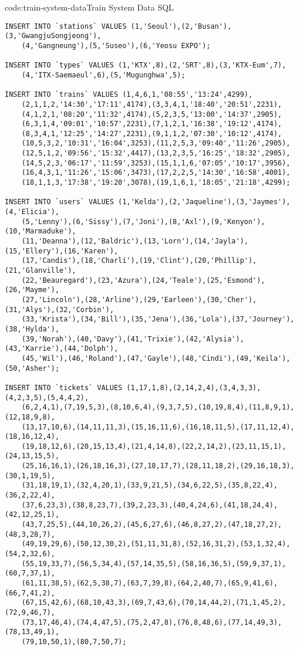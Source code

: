 \begin{codeenv}{code:train-system-data}{Train System Data SQL}\begin{verbatim}
INSERT INTO `stations` VALUES (1,'Seoul'),(2,'Busan'),(3,'GwangjuSongjeong'),
    (4,'Gangneung'),(5,'Suseo'),(6,'Yeosu EXPO');

INSERT INTO `types` VALUES (1,'KTX',8),(2,'SRT',8),(3,'KTX-Eum',7),
    (4,'ITX-Saemaeul',6),(5,'Mugunghwa',5);

INSERT INTO `trains` VALUES (1,4,6,1,'08:55','13:24',4299),
    (2,1,1,2,'14:30','17:11',4174),(3,3,4,1,'18:40','20:51',2231),
    (4,1,2,1,'08:20','11:32',4174),(5,2,3,5,'13:00','14:37',2905),
    (6,3,1,4,'09:01','10:57',2231),(7,1,2,1,'16:38','19:12',4174),
    (8,3,4,1,'12:25','14:27',2231),(9,1,1,2,'07:30','10:12',4174),
    (10,5,3,2,'10:31','16:04',3253),(11,2,5,3,'09:40','11:26',2905),
    (12,5,1,2,'09:56','15:32',4417),(13,2,3,5,'16:25','18:32',2905),
    (14,5,2,3,'06:17','11:59',3253),(15,1,1,6,'07:05','10:17',3956),
    (16,4,3,1,'11:26','15:06',3473),(17,2,2,5,'14:30','16:58',4001),
    (18,1,1,3,'17:38','19:20',3078),(19,1,6,1,'18:05','21:18',4299);

INSERT INTO `users` VALUES (1,'Kelda'),(2,'Jaqueline'),(3,'Jaymes'),(4,'Elicia'),
    (5,'Lenny'),(6,'Sissy'),(7,'Joni'),(8,'Axl'),(9,'Kenyon'),(10,'Marmaduke'),
    (11,'Deanna'),(12,'Baldric'),(13,'Lorn'),(14,'Jayla'),(15,'Ellery'),(16,'Karen'),
    (17,'Candis'),(18,'Charli'),(19,'Clint'),(20,'Phillip'),(21,'Glanville'),
    (22,'Beauregard'),(23,'Azura'),(24,'Teale'),(25,'Esmond'),(26,'Mayme'),
    (27,'Lincoln'),(28,'Arline'),(29,'Earleen'),(30,'Cher'),(31,'Alys'),(32,'Corbin'),
    (33,'Krista'),(34,'Bill'),(35,'Jena'),(36,'Lola'),(37,'Journey'),(38,'Hylda'),
    (39,'Norah'),(40,'Davy'),(41,'Trixie'),(42,'Alysia'),(43,'Karrie'),(44,'Dolph'),
    (45,'Wil'),(46,'Roland'),(47,'Gayle'),(48,'Cindi'),(49,'Keila'),(50,'Asher');

INSERT INTO `tickets` VALUES (1,17,1,8),(2,14,2,4),(3,4,3,3),(4,2,3,5),(5,4,4,2),
    (6,2,4,1),(7,19,5,3),(8,10,6,4),(9,3,7,5),(10,19,8,4),(11,8,9,1),(12,18,9,8),
    (13,17,10,6),(14,11,11,3),(15,16,11,6),(16,18,11,5),(17,11,12,4),(18,16,12,4),
    (19,18,12,6),(20,15,13,4),(21,4,14,8),(22,2,14,2),(23,11,15,1),(24,13,15,5),
    (25,16,16,1),(26,18,16,3),(27,18,17,7),(28,11,18,2),(29,16,18,3),(30,1,19,5),
    (31,18,19,1),(32,4,20,1),(33,9,21,5),(34,6,22,5),(35,8,22,4),(36,2,22,4),
    (37,6,23,3),(38,8,23,7),(39,2,23,3),(40,4,24,6),(41,18,24,4),(42,12,25,1),
    (43,7,25,5),(44,10,26,2),(45,6,27,6),(46,8,27,2),(47,18,27,2),(48,3,28,7),
    (49,19,29,6),(50,12,30,2),(51,11,31,8),(52,16,31,2),(53,1,32,4),(54,2,32,6),
    (55,19,33,7),(56,5,34,4),(57,14,35,5),(58,16,36,5),(59,9,37,1),(60,7,37,1),
    (61,11,38,5),(62,5,38,7),(63,7,39,8),(64,2,40,7),(65,9,41,6),(66,7,41,2),
    (67,15,42,6),(68,10,43,3),(69,7,43,6),(70,14,44,2),(71,1,45,2),(72,9,46,7),
    (73,17,46,4),(74,4,47,5),(75,2,47,8),(76,8,48,6),(77,14,49,3),(78,13,49,1),
    (79,10,50,1),(80,7,50,7);
\end{verbatim}
\end{codeenv}
